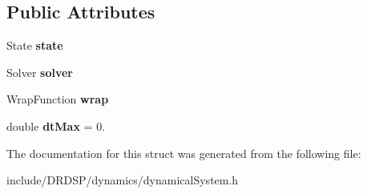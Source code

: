 \subsection*{Public Attributes}
\begin{DoxyCompactItemize}
\item 
\hypertarget{struct_d_r_d_s_p_1_1_continuous_dynamical_system_a0704c63204b6786fdc4299591f14baf9}{State {\bfseries state}}\label{struct_d_r_d_s_p_1_1_continuous_dynamical_system_a0704c63204b6786fdc4299591f14baf9}

\item 
\hypertarget{struct_d_r_d_s_p_1_1_continuous_dynamical_system_a069c1e6770595fc96296bfa8422a259c}{Solver {\bfseries solver}}\label{struct_d_r_d_s_p_1_1_continuous_dynamical_system_a069c1e6770595fc96296bfa8422a259c}

\item 
\hypertarget{struct_d_r_d_s_p_1_1_continuous_dynamical_system_a3232d59b102cd9188b9c992f12faa579}{Wrap\-Function {\bfseries wrap}}\label{struct_d_r_d_s_p_1_1_continuous_dynamical_system_a3232d59b102cd9188b9c992f12faa579}

\item 
\hypertarget{struct_d_r_d_s_p_1_1_continuous_dynamical_system_a610a818a2582ed4ccbbba905e84d0616}{double {\bfseries dt\-Max} = 0.}\label{struct_d_r_d_s_p_1_1_continuous_dynamical_system_a610a818a2582ed4ccbbba905e84d0616}

\end{DoxyCompactItemize}


The documentation for this struct was generated from the following file\-:\begin{DoxyCompactItemize}
\item 
include/\-D\-R\-D\-S\-P/dynamics/dynamical\-System.\-h\end{DoxyCompactItemize}
